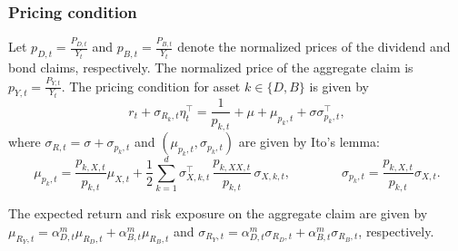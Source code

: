 \subsubsection{Pricing condition}

Let $p_{D,t} = \frac{P_{D,t}}{Y_t}$ and $p_{B,t} = \frac{P_{B,t}}{Y_t}$ denote the normalized prices of the dividend and bond claims, respectively.
The normalized price of the aggregate claim is $p_{Y,t} = \frac{P_{Y,t}}{Y_t}$.
The pricing condition for asset $k \in\{D,B\}$ is given by
\begin{equation}
    r_t + \sigma_{R_k,t} \eta_t^\top = \frac{1}{p_{k,t}} + \mu + \mu_{p_k,t} + \sigma \sigma_{p_k,t}^\top,
\end{equation}
where $\sigma_{R,t} = \sigma + \sigma_{p_k,t}$ and $(\mu_{p_k,t}, \sigma_{p_k,t})$ are given by Ito's lemma:
\begin{equation}
    \mu_{p_k,t} = \frac{p_{k,X,t}}{p_{k,t}} \mu_{X,t} + \frac{1}{2}\sum_{k=1}^d \sigma_{X,k,t}^\top\,\frac{p_{k,XX,t}}{p_{k,t}}\,\sigma_{X,k,t}, \qquad \qquad 
    \sigma_{p_k,t} = \frac{p_{k,X,t}}{p_{k,t}} \sigma_{X,t}.
\end{equation}

The expected return and risk exposure on the aggregate claim are given by
 $\mu_{R_Y,t} = \alpha_{D,t}^m \mu_{R_D,t} + \alpha_{B,t}^m \mu_{R_B,t}$ and $\sigma_{R_Y,t} = \alpha_{D,t}^m \sigma_{R_D,t} + \alpha_{B,t}^m \sigma_{R_B,t}$, respectively.




